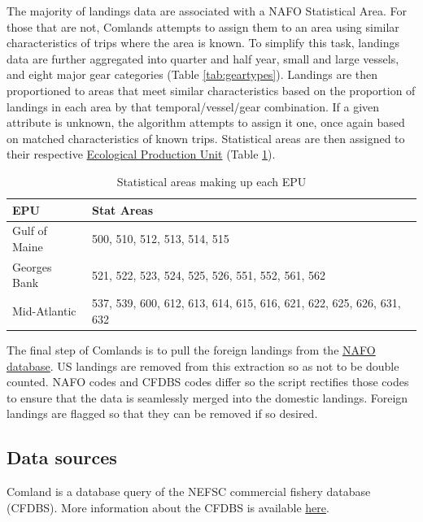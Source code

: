 \documentclass[
]{book}
\begin{document}
The majority of landings data are associated with a NAFO Statistical Area. For those that are not, Comlands attempts to assign them to an area using similar characteristics of trips where the area is known. To simplify this task, landings data are further aggregated into quarter and half year, small and large vessels, and eight major gear categories (Table \ref{tab:geartypes}). Landings are then proportioned to areas that meet similar characteristics based on the proportion of landings in each area by that temporal/vessel/gear combination. If a given attribute is unknown, the algorithm attempts to assign it one, once again based on matched characteristics of known trips. Statistical areas are then assigned to their respective \protect\hyperlink{epu}{Ecological Production Unit} (Table \ref{tab:statareas}).

\begin{table}[H]

\caption{\label{tab:statareas}Statistical areas making up each EPU}
\centering
\begin{tabular}[t]{l|l}
\hline
EPU & Stat Areas\\
\hline
Gulf of Maine & 500, 510, 512, 513, 514, 515\\
\hline
Georges Bank & 521, 522, 523, 524, 525, 526, 551, 552, 561, 562\\
\hline
Mid-Atlantic & 537, 539, 600, 612, 613, 614, 615, 616, 621, 622, 625, 626, 631, 632\\
\hline
\end{tabular}
\end{table}

The final step of Comlands is to pull the foreign landings from the \href{https://www.nafo.int/Data/frames}{NAFO database}. US landings are removed from this extraction so as not to be double counted. NAFO codes and CFDBS codes differ so the script rectifies those codes to ensure that the data is seamlessly merged into the domestic landings. Foreign landings are flagged so that they can be removed if so desired.

\hypertarget{data-sources-10}{%
\subsection{Data sources}\label{data-sources-10}}

Comland is a database query of the NEFSC commercial fishery database (CFDBS). More information about the CFDBS is available \href{https://inport.nmfs.noaa.gov/inport/item/27401}{here}.
\end{document}
